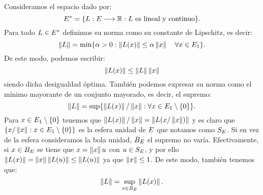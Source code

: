 Consideramos el espacio dado por:
\[
E^* =  \lbrace L:E \longrightarrow \mathbb{R}: L \text{ es lineal y continuo} \rbrace.
\]
Para todo $ L \in E^* $ definimos su norma como su constante de Lipschitz, es decir:
\[
\left\Vert L\right\Vert = \min \lbrace \alpha > 0:  \left\Vert L(x)\right\Vert \leq \alpha \left\Vert x\right\Vert \quad \forall x \in E_1\rbrace.
\]
De este modo, podemos escribir:
\begin{equation*}\label{desigNorma}
	\left\Vert L(x)\right\Vert \leq \left\Vert L\right\Vert \left\Vert x\right\Vert
\end{equation*}
siendo dicha desigualdad óptima. También podemos expresar su norma como el mínimo mayorante de un conjunto mayorado, es decir, el supremo:
\[
\left\Vert L\right\Vert = \sup \lbrace \left\Vert L(x)\right\Vert/\left\Vert x\right\Vert : \forall x \in E_1 \setminus \{0\}\rbrace.
\]
Para $  x \in E_1 \setminus \{0\} $ tenemos que $ \left\Vert L(x)\right\Vert/\left\Vert x\right\Vert = \left\Vert L(x/\left\Vert x\right\Vert)\right\Vert$ y es claro que $ \{ x/\left\Vert x\right\Vert : x \in E_1 \setminus \{0\}\} $ es la esfera unidad de $ E $ que notamos como $ S_E $. Si en vez de la esfera consideramos la bola unidad, $ B_E $ el supremo no varía. Efectivamente, si $ x \in B_E  $ se tiene que $ x = \left\Vert x\right\Vert u $ con $ u \in  S_E$, y por ello $ \left\Vert L(x)\right\Vert = \left\Vert x\right\Vert\left\Vert L(u)\right\Vert \leq \left\Vert L(u)\right\Vert $ ya que $ \left\Vert x\right\Vert \leq 1 $. De este modo, también tenemos que:
\begin{equation*}\label{normSup}
	\left\Vert L\right\Vert =\sup_{x \in B_E} \left\Vert L(x)\right\Vert.
\end{equation*}

